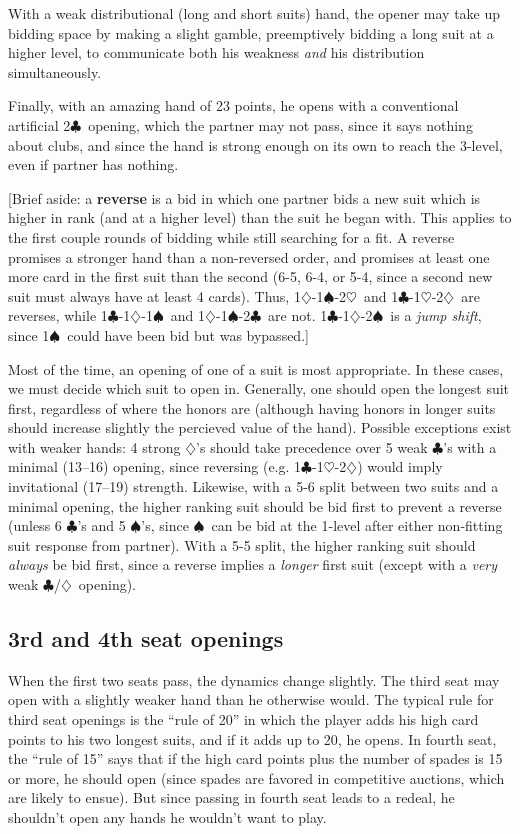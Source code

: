 \documentclass[11pt]{article}
\def\C{$\clubsuit$}
\def\D{$\diamondsuit$}
\def\H{$\heartsuit$}
\def\S{$\spadesuit$}
\begin{document}
With a weak distributional (long and short suits) hand, 
the opener may take up bidding space by making a slight gamble, 
preemptively bidding a long suit at a higher level, to communicate
both his weakness \emph{and} his distribution simultaneously.

Finally, with an amazing hand of 23 points, he opens with a conventional
artificial 2\C\ opening, which the partner may not pass, since it
says nothing about clubs, and since the hand is strong enough on its
own to reach the 3-level, even if partner has nothing.

[Brief aside: a \textbf{reverse} is a bid in which one partner bids a
new suit which is higher in rank (and at a higher level) than the suit
he began with.  This applies to the first couple rounds of bidding
while still searching for a fit.  A reverse promises a stronger hand
than a non-reversed order, and promises at least one more card in the
first suit than the second (6-5, 6-4, or 5-4, since a second new suit
must always have at least 4 cards).  Thus, 1\D-1\S-2\H\ and 1\C-1\H-2\D\ 
are reverses, while 1\C-1\D-1\S\ and 1\D-1\S-2\C\ are not.  1\C-1\D-2\S\ 
is a \emph{jump shift}, since 1\S\ could have been bid but was bypassed.]

Most of the time, an opening of one of a suit is most appropriate.
In these cases, we must decide which suit to open in.  Generally, one
should open the longest suit first, regardless of where the honors are
(although having honors in longer suits should increase slightly the
percieved value of the hand).  Possible exceptions exist with weaker
hands: 4 strong \D's should take precedence over 5 weak \C's with a
minimal (13--16) opening, since reversing (e.g. 1\C-1\H-2\D) would imply
invitational (17--19) strength.  Likewise, with a 5-6 split between
two suits and a minimal opening, the higher ranking suit should be
bid first to prevent a reverse (unless 6 \C's and 5 \S's, since \S\ can
be bid at the 1-level after either non-fitting suit response from partner).
With a 5-5 split, the higher ranking suit should \emph{always} be bid first,
since a reverse implies a \emph{longer} first suit (except with a \emph{very}
weak \C/\D\ opening).

\subsection{3rd and 4th seat openings}
When the first two seats pass, the dynamics change slightly.  The
third seat may open with a slightly weaker hand than he otherwise
would.  The typical rule for third seat openings is the ``rule of 20''
in which the player adds his high card points to his two longest
suits, and if it adds up to 20, he opens.  In fourth seat, the ``rule
of 15'' says that if the high card points plus the number of spades is
15 or more, he should open (since spades are favored in competitive
auctions, which are likely to ensue).  But since passing in fourth
seat leads to a redeal, he shouldn't open any hands he wouldn't want
to play.
\end{document}
